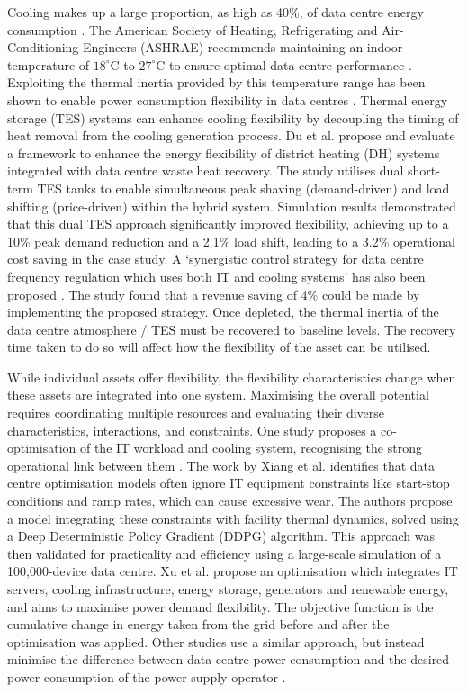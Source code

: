 \documentclass[lettersize,journal]{IEEEtran}
\begin{document}
Cooling makes up a large proportion, as high as 40\%, of data centre energy consumption \cite{zhao2021synthetic}. The American Society of Heating, Refrigerating and Air-Conditioning Engineers (ASHRAE) recommends maintaining an indoor temperature of $18^\circ\mathrm{C}$ to $27^\circ\mathrm{C}$ to ensure optimal data centre performance \cite{tc2016data}. Exploiting the thermal inertia provided by this temperature range has been shown to enable power consumption flexibility in data centres \cite{takci2025data,ref22}. Thermal energy storage (TES) systems can enhance cooling flexibility by decoupling the timing of heat removal from the cooling generation process.
Du et al. \cite{du2025new} propose and evaluate a framework to enhance the energy flexibility of district heating (DH) systems integrated with data centre waste heat recovery. The study utilises dual short-term TES tanks to enable simultaneous peak shaving (demand-driven) and load shifting (price-driven) within the hybrid system. Simulation results demonstrated that this dual TES approach significantly improved flexibility, achieving up to a 10\% peak demand reduction and a 2.1\% load shift, leading to a 3.2\% operational cost saving in the case study. A `synergistic control strategy for data centre frequency regulation which uses both IT and cooling systems' has also been proposed \cite{Fu2020ApEn}. The study found that a revenue saving of 4\% could be made by implementing the proposed strategy. Once depleted, the thermal inertia of the data centre atmosphere / TES must be recovered to baseline levels. The recovery time taken to do so will affect how the flexibility of the asset can be utilised.


While individual assets offer flexibility, the flexibility characteristics change when these assets are integrated into one system. Maximising the overall potential requires coordinating multiple resources and evaluating their diverse characteristics, interactions, and constraints. One study proposes a co-optimisation of the IT workload and cooling system, recognising the strong operational link between them \cite{Fu2020ApEn}. The work by Xiang et al. \cite{xiang2023modeling} identifies that data centre optimisation models often ignore IT equipment constraints like start-stop conditions and ramp rates, which can cause excessive wear. The authors propose a model integrating these constraints with facility thermal dynamics, solved using a Deep Deterministic Policy Gradient (DDPG) algorithm. This approach was then validated for practicality and efficiency using a large-scale simulation of a 100,000-device data centre.
Xu et al. \cite{Xu2023SPIE} propose an optimisation which integrates IT servers, cooling infrastructure, energy storage, generators and renewable energy, and aims to maximise power demand flexibility. The objective function is the cumulative change in energy taken from the grid before and after the optimisation was applied. 
Other studies use a similar approach, but instead minimise the difference between data centre power consumption and the desired power consumption of the power supply operator \cite{cioara2018optimized}. 
\end{document}
